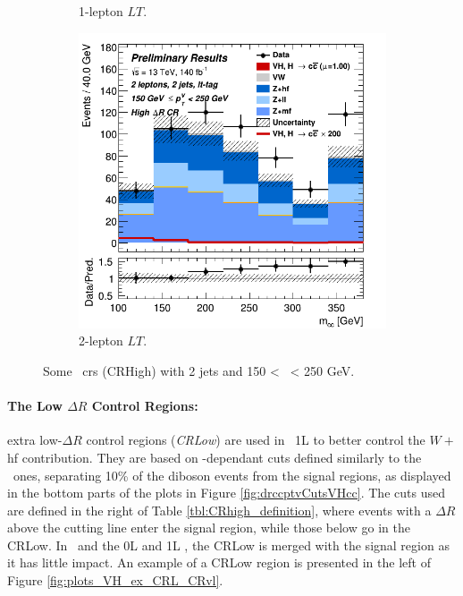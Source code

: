 \begin{figure}[h!]
\begin{subfigure}[b]{0.32\textwidth}
      \caption{1-lepton $LT$.}
      \label{fig:plots_VHcc_ex_1L_CRH}
  \end{subfigure}
  \begin{subfigure}[b]{0.32\textwidth}
    \centering
    \includegraphics[width=\textwidth]{Images/VH/Own_fit/prefit_VHcc/Region_distmBB_BMax250_BMin150_DCRHigh_J2_TTypelt_T2_L2_Y6051_Prefit.png}
    \caption{2-lepton $LT$.}
    \label{fig:plots_VHcc_ex_2L_CRH}
\end{subfigure}
  \caption{Some \highdr\ \gls{cr}s (CRHigh) with 2 jets and 150 < \ptv\ < 250 GeV.}
  \label{fig:plots_VHcc_ex_CRH}
\end{figure} 

\paragraph{The Low $\Delta R$ Control Regions:} extra low-$\Delta R$ control regions (\textit{CRLow}) are used in \vhb\ 1L to better control the $W+$hf contribution. They are based on \ptv-dependant cuts defined similarly to the \highdr\ ones, separating 10\% of the diboson events from the signal regions, as displayed in the bottom parts of the plots in Figure \ref{fig:drccptvCutsVHcc}. The cuts used are defined in the right of Table \ref{tbl:CRhigh_definition}, where events with a $\Delta R$ above the cutting line enter the signal region, while those below go in the CRLow. In \vhc\ and the 0L and 1L \vhb, the CRLow is merged with the signal region as it has little impact. An example of a CRLow region is presented in the left of Figure \ref{fig:plots_VH_ex_CRL_CRvl}.

